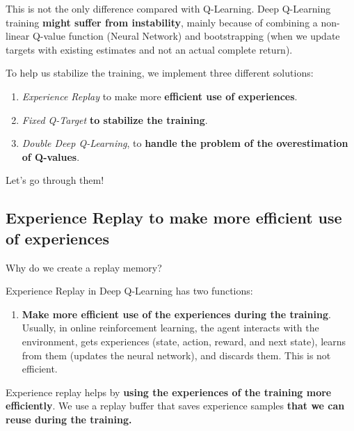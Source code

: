 \documentclass[11pt,a4paper]{article}
\begin{document}

This is not the only difference compared with Q-Learning. Deep Q-Learning training \textbf{might suffer from instability}, mainly because of combining a non-linear Q-value function (Neural Network) and bootstrapping (when we update targets with existing estimates and not an actual complete return).

To help us stabilize the training, we implement three different solutions:

\begin{enumerate}
\def\labelenumi{\arabic{enumi}.}
\tightlist
\item
  \emph{Experience Replay} to make more \textbf{efficient use of experiences}.
\item
  \emph{Fixed Q-Target} \textbf{to stabilize the training}.
\item
  \emph{Double Deep Q-Learning}, to \textbf{handle the problem of the overestimation of Q-values}.
\end{enumerate}

Let's go through them!

\subsection{Experience Replay to make more efficient use of experiences}\label{experience-replay-to-make-more-efficient-use-of-experiences}

Why do we create a replay memory?

Experience Replay in Deep Q-Learning has two functions:

\begin{enumerate}
\def\labelenumi{\arabic{enumi}.}
\tightlist
\item
  \textbf{Make more efficient use of the experiences during the training}. Usually, in online reinforcement learning, the agent interacts with the environment, gets experiences (state, action, reward, and next state), learns from them (updates the neural network), and discards them. This is not efficient.
\end{enumerate}

Experience replay helps by \textbf{using the experiences of the training more efficiently}. We use a replay buffer that saves experience samples \textbf{that we can reuse during the training.}
\end{document}
